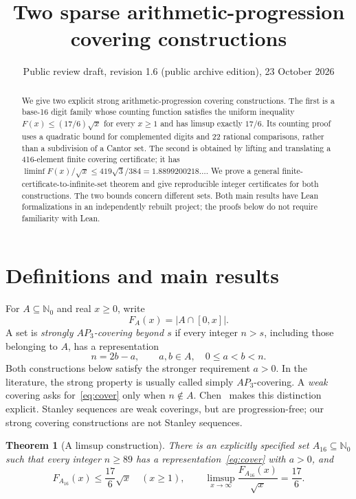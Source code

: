 \documentclass[11pt]{article}
\title{Two sparse arithmetic-progression\protect\\covering constructions}
\author{}
\date{Public review draft, revision 1.6 (public archive edition), 23 October 2026}
\newtheorem{theorem}{Theorem}[section]
\theoremstyle{definition}\newtheorem{definition}[theorem]{Definition}
\theoremstyle{remark}\newtheorem{remark}[theorem]{Remark}
\numberwithin{equation}{section}
\newcommand{\N}{\mathbb N_0}
\newcommand{\card}[1]{\lvert #1\rvert}
\begin{document}
\maketitle\thispagestyle{fancy}
\begin{abstract}
We give two explicit strong arithmetic-progression covering constructions. The first is a base-16 digit family whose counting function satisfies the uniform inequality $F(x)\le(17/6)\sqrt{x}$ for every $x\ge1$ and has limsup exactly $17/6$. Its counting proof uses a quadratic bound for complemented digits and 22 rational comparisons, rather than a subdivision of a Cantor set. The second is obtained by lifting and translating a 416-element finite covering certificate; it has $\liminf F(x)/\sqrt{x}\le419\sqrt3/384=1.8899200218\ldots$. We prove a general finite-certificate-to-infinite-set theorem and give reproducible integer certificates for both constructions. The two bounds concern different sets. Both main results have Lean formalizations in an independently rebuilt project; the proofs below do not require familiarity with Lean.
\end{abstract}

\section{Definitions and main results}\label{sec:main}
For $A\subseteq\N$ and real $x\ge0$, write
\[
F_A(x)=\card{A\cap[0,x]}.
\]
A set is \emph{strongly $AP_3$-covering beyond $s$} if every integer $n>s$, including those belonging to $A$, has a representation
\begin{equation}\label{eq:cover}
n=2b-a,\qquad a,b\in A,\quad 0\le a<b<n.
\end{equation}
Both constructions below satisfy the stronger requirement $a>0$. In the literature, the strong property is usually called simply $AP_3$-covering. A \emph{weak} covering asks for~\eqref{eq:cover} only when $n\notin A$. Chen~\cite{Chen} makes this distinction explicit. Stanley sequences are weak coverings, but are progression-free; our strong covering constructions are not Stanley sequences.

\begin{theorem}[A limsup construction]\label{thm:sup}
There is an explicitly specified set $A_{16}\subseteq\N$ such that every integer $n\ge89$ has a representation~\eqref{eq:cover} with $a>0$, and
\begin{equation}\label{eq:sup}
F_{A_{16}}(x)\le\frac{17}{6}\sqrt{x}\quad(x\ge1),
\qquad
\limsup_{x\to\infty}\frac{F_{A_{16}}(x)}{\sqrt{x}}=\frac{17}{6}.
\end{equation}
\end{theorem}
\end{document}

